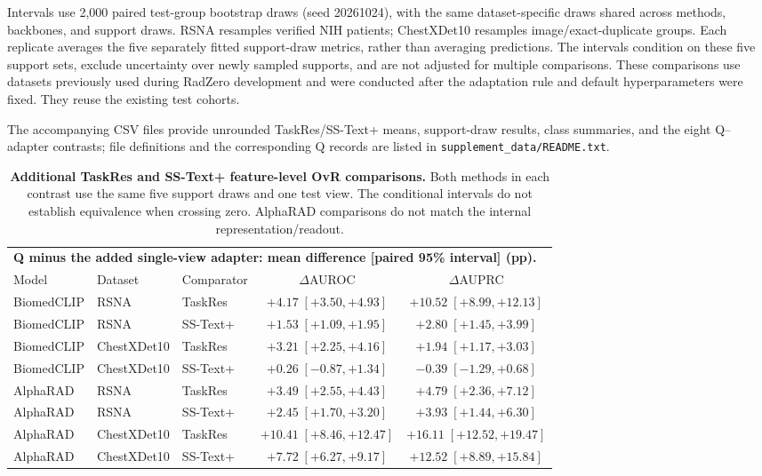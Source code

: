 Intervals use 2,000 paired test-group bootstrap draws (seed 20261024), with the same dataset-specific draws shared across methods, backbones, and support draws. RSNA resamples verified NIH patients; ChestXDet10 resamples image/exact-duplicate groups. Each replicate averages the five separately fitted support-draw metrics, rather than averaging predictions. The intervals condition on these five support sets, exclude uncertainty over newly sampled supports, and are not adjusted for multiple comparisons. These comparisons use datasets previously used during RadZero development and were conducted after the adaptation rule and default hyperparameters were fixed. They reuse the existing test cohorts.

The accompanying CSV files provide unrounded TaskRes/SS-Text+ means, support-draw results, class summaries, and the eight Q--adapter contrasts; file definitions and the corresponding Q records are listed in \nolinkurl{supplement_data/README.txt}.

\begin{table}[tp]
\centering
\footnotesize
\setlength{\tabcolsep}{4pt}
\begin{tabular*}{\textwidth}{@{\extracolsep{\fill}}lllcc@{}}
\toprule
\multicolumn{5}{l}{\textbf{Q minus the added single-view adapter: mean difference [paired 95\% interval] (pp).}} \\
Model & Dataset & Comparator & $\Delta$AUROC & $\Delta$AUPRC \\
\midrule
BiomedCLIP & RSNA & TaskRes & $+4.17\;[+3.50,+4.93]$ & $+10.52\;[+8.99,+12.13]$ \\
BiomedCLIP & RSNA & SS-Text+ & $+1.53\;[+1.09,+1.95]$ & $+2.80\;[+1.45,+3.99]$ \\
\addlinespace[2pt]
BiomedCLIP & ChestXDet10 & TaskRes & $+3.21\;[+2.25,+4.16]$ & $+1.94\;[+1.17,+3.03]$ \\
BiomedCLIP & ChestXDet10 & SS-Text+ & $+0.26\;[-0.87,+1.34]$ & $-0.39\;[-1.29,+0.68]$ \\
\addlinespace[2pt]
AlphaRAD & RSNA & TaskRes & $+3.49\;[+2.55,+4.43]$ & $+4.79\;[+2.36,+7.12]$ \\
AlphaRAD & RSNA & SS-Text+ & $+2.45\;[+1.70,+3.20]$ & $+3.93\;[+1.44,+6.30]$ \\
\addlinespace[2pt]
AlphaRAD & ChestXDet10 & TaskRes & $+10.41\;[+8.46,+12.47]$ & $+16.11\;[+12.52,+19.47]$ \\
AlphaRAD & ChestXDet10 & SS-Text+ & $+7.72\;[+6.27,+9.17]$ & $+12.52\;[+8.89,+15.84]$ \\
\bottomrule
\end{tabular*}
\caption{\textbf{Additional TaskRes and SS-Text+ feature-level OvR comparisons.} Both methods in each contrast use the same five support draws and one test view. The conditional intervals do not establish equivalence when crossing zero. AlphaRAD comparisons do not match the internal representation/readout.}
\label{tab:supp-taskres-sstext}
\end{table}
